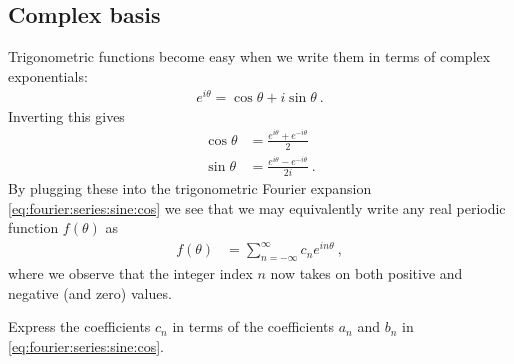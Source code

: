 \documentclass[12pt, oneside]{report}    %
\begin{document}
\subsection{Complex basis}
Trigonometric functions become easy when we write them in terms of complex exponentials:
\begin{align}
    e^{i\theta} = \cos\theta + i \sin\theta \ .
\end{align}
Inverting this gives
\begin{align}
    \cos\theta &= \frac{e^{i\theta} + e^{-i\theta}}{2}
    \\
    \sin\theta &= \frac{e^{i\theta} - e^{-i\theta}}{2i} 
    \ .
\end{align}
By plugging these into the trigonometric Fourier expansion \eqref{eq:fourier:series:sine:cos} we see that we may equivalently write any real periodic function $f(\theta)$ as
\begin{align}
    f(\theta) &= \sum_{n=-\infty}^\infty
    c_n e^{in\theta} \ ,
    \label{eq:fourier:complex:series}
\end{align}
where we observe that the integer index $n$ now takes on both positive and negative (and zero) values. 
\begin{exercise}
Express the coefficients $c_n$ in terms of the coefficients $a_n$ and $b_n$ in  \eqref{eq:fourier:series:sine:cos}.
\end{exercise}
\end{document}
